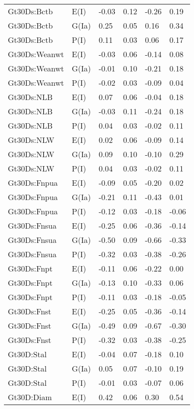 \begin{center}
\begin{longtable}{|p{1.1in}|p{0.7in}|p{0.7in}|p{0.6in}|p{0.6in}|p{0.6in}|}
  Gt30Ds:Bctb & E(I) & -0.03 & 0.12 & -0.26 & 0.19 \\ 
  Gt30Ds:Bctb & G(Ia) & 0.25 & 0.05 & 0.16 & 0.34 \\ 
  Gt30Ds:Bctb & P(I) & 0.11 & 0.03 & 0.06 & 0.17 \\ 
  Gt30Ds:Weanwt & E(I) & -0.03 & 0.06 & -0.14 & 0.08 \\ 
  Gt30Ds:Weanwt & G(Ia) & -0.01 & 0.10 & -0.21 & 0.18 \\ 
  Gt30Ds:Weanwt & P(I) & -0.02 & 0.03 & -0.09 & 0.04 \\ 
  Gt30Ds:NLB & E(I) & 0.07 & 0.06 & -0.04 & 0.18 \\ 
  Gt30Ds:NLB & G(Ia) & -0.03 & 0.11 & -0.24 & 0.18 \\ 
  Gt30Ds:NLB & P(I) & 0.04 & 0.03 & -0.02 & 0.11 \\ 
  Gt30Ds:NLW & E(I) & 0.02 & 0.06 & -0.09 & 0.14 \\ 
  Gt30Ds:NLW & G(Ia) & 0.09 & 0.10 & -0.10 & 0.29 \\ 
  Gt30Ds:NLW & P(I) & 0.04 & 0.03 & -0.02 & 0.11 \\ 
  Gt30Ds:Fnpua & E(I) & -0.09 & 0.05 & -0.20 & 0.02 \\ 
  Gt30Ds:Fnpua & G(Ia) & -0.21 & 0.11 & -0.43 & 0.01 \\ 
  Gt30Ds:Fnpua & P(I) & -0.12 & 0.03 & -0.18 & -0.06 \\ 
  Gt30Ds:Fnsua & E(I) & -0.25 & 0.06 & -0.36 & -0.14 \\ 
  Gt30Ds:Fnsua & G(Ia) & -0.50 & 0.09 & -0.66 & -0.33 \\ 
  Gt30Ds:Fnsua & P(I) & -0.32 & 0.03 & -0.38 & -0.26 \\ 
  Gt30Ds:Fnpt & E(I) & -0.11 & 0.06 & -0.22 & 0.00 \\ 
  Gt30Ds:Fnpt & G(Ia) & -0.13 & 0.10 & -0.33 & 0.06 \\ 
  Gt30Ds:Fnpt & P(I) & -0.11 & 0.03 & -0.18 & -0.05 \\ 
  Gt30Ds:Fnst & E(I) & -0.25 & 0.05 & -0.36 & -0.14 \\ 
  Gt30Ds:Fnst & G(Ia) & -0.49 & 0.09 & -0.67 & -0.30 \\ 
  Gt30Ds:Fnst & P(I) & -0.32 & 0.03 & -0.38 & -0.25 \\ 
  Gt30D:Stal & E(I) & -0.04 & 0.07 & -0.18 & 0.10 \\ 
  Gt30D:Stal & G(Ia) & 0.05 & 0.07 & -0.10 & 0.19 \\ 
  Gt30D:Stal & P(I) & -0.01 & 0.03 & -0.07 & 0.06 \\ 
  Gt30D:Diam & E(I) & 0.42 & 0.06 & 0.30 & 0.54 \\ 

\end{longtable}
\end{center}
